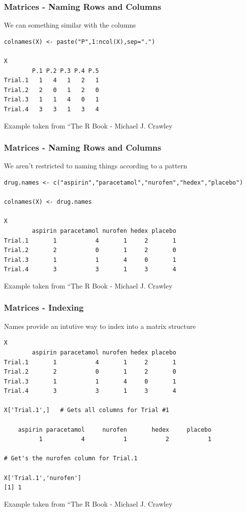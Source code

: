 \documentclass{beamer}
\begin{document}
\begin{frame}[fragile]
\frametitle{Matrices - Naming Rows and Columns}
We can something similar with the columns
\small
\begin{verbatim}
colnames(X) <- paste("P",1:ncol(X),sep=".")
 
X
        P.1 P.2 P.3 P.4 P.5
Trial.1   1   4   1   2   1
Trial.2   2   0   1   2   0
Trial.3   1   1   4   0   1
Trial.4   3   3   1   3   4
\end{verbatim}
\scriptsize
Example taken from ``The R Book - Michael J. Crawley
\end{frame}


\begin{frame}[fragile]
\frametitle{Matrices - Naming Rows and Columns}
We aren't restricted to naming things according to a pattern
\footnotesize
\begin{verbatim}
drug.names <- c("aspirin","paracetamol","nurofen","hedex","placebo")

colnames(X) <- drug.names

X
        aspirin paracetamol nurofen hedex placebo
Trial.1       1           4       1     2       1
Trial.2       2           0       1     2       0
Trial.3       1           1       4     0       1
Trial.4       3           3       1     3       4

\end{verbatim}
\scriptsize
Example taken from ``The R Book - Michael J. Crawley
\end{frame}


\begin{frame}[fragile]
\frametitle{Matrices - Indexing}
Names provide an intutive way to index into a matrix structure
\footnotesize
\begin{verbatim}
X
        aspirin paracetamol nurofen hedex placebo
Trial.1       1           4       1     2       1
Trial.2       2           0       1     2       0
Trial.3       1           1       4     0       1
Trial.4       3           3       1     3       4

X['Trial.1',]   # Gets all columns for Trial #1

    aspirin paracetamol     nurofen       hedex     placebo 
          1           4           1           2           1 

# Get's the nurofen column for Trial.1

X['Trial.1','nurofen']
[1] 1
\end{verbatim}
\scriptsize
Example taken from ``The R Book - Michael J. Crawley
\end{frame}
\end{document}
